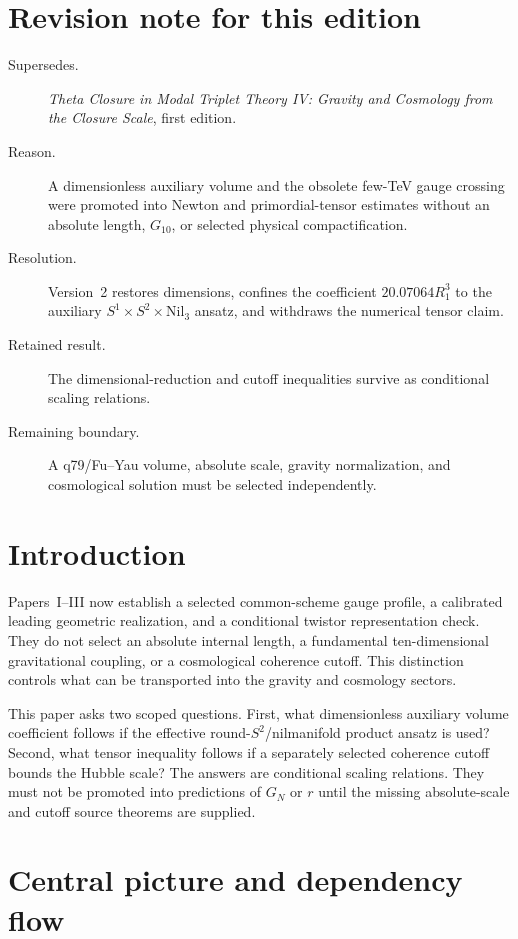 \documentclass[11pt]{article}
\begin{document}
\section*{Revision note for this edition}
\begin{description}
\item[Supersedes.] \emph{Theta Closure in Modal Triplet Theory IV: Gravity
and Cosmology from the Closure Scale}, first edition.
\item[Reason.] A dimensionless auxiliary volume and the obsolete few-TeV gauge
crossing were promoted into Newton and primordial-tensor estimates without an
absolute length, $G_{10}$, or selected physical compactification.
\item[Resolution.] Version~2 restores dimensions, confines the coefficient
$20.07064R_1^3$ to the auxiliary $S^1\times S^2\times\mathrm{Nil}_3$ ansatz,
and withdraws the numerical tensor claim.
\item[Retained result.] The dimensional-reduction and cutoff inequalities
survive as conditional scaling relations.
\item[Remaining boundary.] A q79/Fu--Yau volume, absolute scale, gravity
normalization, and cosmological solution must be selected independently.
\end{description}


\section{Introduction}

Papers~I--III now establish a selected common-scheme gauge profile, a
calibrated leading geometric realization, and a conditional twistor
representation check. They do not select an absolute internal length, a
fundamental ten-dimensional gravitational coupling, or a cosmological
coherence cutoff. This distinction controls what can be transported into the
gravity and cosmology sectors.

This paper asks two scoped questions. First, what dimensionless auxiliary
volume coefficient follows if the effective round-$S^2$/nilmanifold product
ansatz is used? Second, what tensor inequality follows if a separately selected
coherence cutoff bounds the Hubble scale? The answers are conditional scaling
relations. They must not be promoted into predictions of $G_N$ or $r$ until
the missing absolute-scale and cutoff source theorems are supplied.

\section{Central picture and dependency flow}
\end{document}
